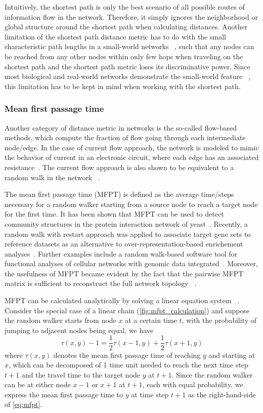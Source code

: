 Intuitively, the shortest path is only the best scenario of all possible routes
of information flow in the network. Therefore, it simply ignores the 
neighborhood or global structure around the shortest path when calculating
distances. Another limitation of the shortest path distance metric has to do
with the small characteristic path lengths in a small-world networks~%
\citep{Watts1998}, such that any nodes can be reached from any other nodes
within only few hops when traveling on the shortest path and the shortest path
metric loses its discriminative power. Since most biological
and real-world networks demonstrate the small-world feature~%
\citep{Barabasi2004}, this limitation
has to be kept in mind when working with the shortest path.

\subsubsection{Mean first passage time}
Another category of distance metric in networks is the 
so-called flow-based methods, which compute the fraction of flow going through each intermediate node/edge. In the case of current flow approach, the network is modeled to mimic the behavior of current in an electronic circuit, where each edge has an associated resistance~\citep{Missiuro2009}. The current flow approach is
also shown to be equivalent to a random walk in the network~%
\citep{Doyle2000}.

The mean first passage time (MFPT) is defined as the average time/steps 
necessary for 
a random walker starting from a source node to reach a target node for the
first time. It has been shown that MFPT can be used to detect community
structures in the protein interaction network of yeast~\citep{Zhou2003}. 
Recently, a random walk with restart approach was applied to associate
target gene sets to reference datasets as an alternative to 
over-representation-based enrichement analyses~\citep{Glaab2012}. 
Further examples include a random walk-based software tool for functional
analyses of cellular networks with genomic data integrated~\citep{Komurov2012a}.
Moreover,
the usefulness of MFPT became evident by the fact that the pairwise MFPT 
matrix is sufficient to reconstruct the full network topology~%
\citep{Wittmann2009}.

MFPT can be calculated analytically by solving a linear equation system~%
\citep{Kampen2007}. Consider the special case of a linear chain 
(\ref{fig:mfpt_calculation}) and suppose the random walker starts from node 
$x$ at a certain time $t$, with the probability of jumping to adjacent nodes
being equal, we have
\begin{equation}
\tau(x,y) - 1 = \frac{1}{2}\tau(x-1,y) + \frac{1}{2}\tau(x+1,y)
\label{eq:mfpt}
\end{equation}
where $\tau(x,y)$ denotes the mean first passage time of reaching $y$ and 
starting at $x$, which can be decomposed of 1 time unit needed to reach the
next time step $t+1$ and the travel time to the target node $y$ at $t+1$.
Since the random walker can be at either node $x-1$ or $x+1$ at $t+1$, each
with equal probability, we express the mean first passage time to $y$ at
time step $t+1$ as the right-hand-side of \ref{eq:mfpt}.

